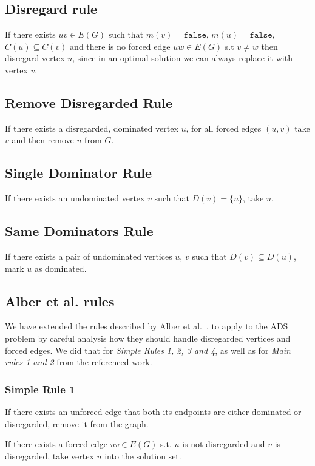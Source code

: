 \documentclass[a4paper,UKenglish,cleveref, autoref, thm-restate]{lipics-v2021}
\begin{document}
\subsection{Disregard rule}
If there exists $uv \in E(G)$ such that $m(v) = \texttt{false}$, $m(u) = \texttt{false}$, $C(u) \subseteq C(v)$
and there is no forced edge $uw \in E(G)$ s.t $v \neq w$
then disregard vertex $u$, since in an optimal solution we can always replace it with vertex $v$.

\subsection{Remove Disregarded Rule}
If there exists a disregarded, dominated vertex $u$, for all forced edges $(u, v)$ take $v$ and then remove $u$ from $G$. 

\subsection{Single Dominator Rule}
\label{rule:singledominator}
If there exists an undominated vertex $v$ such that $D(v) = \{u\}$, take $u$.

\subsection{Same Dominators Rule}
\label{rule:samedominators}

If there exists a pair of undominated vertices $u$, $v$ such that $D(v) \subseteq D(u)$, mark $u$ as dominated.

\subsection{Alber et al. rules}

We have extended the rules described by Alber et al.~\cite{DBLP:journals/anor/AlberBN06}, to apply to the ADS problem by careful analysis how
they should handle disregarded vertices and forced edges. We did that for \emph{Simple Rules 1, 2, 3 and 4}, as well as for \emph{Main rules 1 and 2} from the referenced work.
\subsubsection{Simple Rule 1}
If there exists an unforced edge that both its endpoints are either dominated or disregarded, remove it from the graph.

If there exists a forced edge $uv \in E(G)$ s.t. $u$ is not disregarded and $v$ is disregarded, take vertex $u$ into the solution set.
\end{document}
